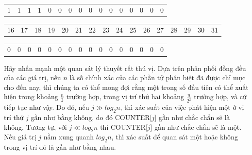 \documentclass[a4paper,13pt]{article}
\theoremstyle{mytheor}
\begin{document}
\begin{mdframed}
\begin{center}
\begin{tabular}{|p{0.4cm}|p{0.4cm}|p{0.4cm}|p{0.4cm}|p{0.4cm}|p{0.4cm}|p{0.4cm}|p{0.4cm}|p{0.4cm}|p{0.4cm}|p{0.4cm}|p{0.4cm}|p{0.4cm}|p{0.4cm}|p{0.4cm}|p{0.4cm}|}
            \hline
            1 & 1 & 1 & 1 & 0 & 0 & 0 & 0 & 0 & 0 & 0 & 0 & 0 & 0 & 0 & 0 \\ \cline{1-16} %
        \end{tabular}
        \begin{tabular}{p{0.4cm}p{0.4cm}p{0.4cm}p{0.4cm}p{0.4cm}p{0.4cm}p{0.4cm}p{0.4cm}p{0.4cm}p{0.4cm}p{0.4cm}p{0.4cm}p{0.4cm}p{0.4cm}p{0.4cm}p{0.4cm}}
            16 & 17 & 18 & 19 & 20 & 21 & 22 & 23 & 24 & 25 & 26 & 27 & 28 & 29 & 30 & 31 %
        \end{tabular}
        \begin{tabular}{|p{0.4cm}|p{0.4cm}|p{0.4cm}|p{0.4cm}|p{0.4cm}|p{0.4cm}|p{0.4cm}|p{0.4cm}|p{0.4cm}|p{0.4cm}|p{0.4cm}|p{0.4cm}|p{0.4cm}|p{0.4cm}|p{0.4cm}|p{0.4cm}|}
            \hline
            0 & 0 & 0 & 0 & 0 & 0 & 0 & 0 & 0 & 0 & 0 & 0 & 0 & 0 & 0 & 0 \\ \cline{1-16} %
        \end{tabular}
    \end{center}
\end{mdframed}

Hãy nhấn mạnh một quan sát lý thuyết rất thú vị. Dựa trên phân phối đồng đều của các giá trị, nếu $n$ là số chính xác của các phần tử phân biệt 
đã được chỉ mục cho đến nay, thì chúng ta có thể mong đợi rằng một trong số đầu tiên có thể xuất hiện trong khoảng $\frac{n}{2}$ trường hợp, 
trong vị trí thứ hai khoảng $\frac{n}{2^2}$ trường hợp, và cứ tiếp tục như vậy. Do đó, nếu $j\gg log_2n$, thì xác suất của việc phát hiện một 
ở vị trí thứ $j$ gần như bằng không, do đó COUNTER[$j$] gần như chắc chắn sẽ là không. Tương tự, với $j\ll log_2n$ thì COUNTER[$j$] gần như chắc chắn 
sẽ là một. Nếu giá trị $j$ nằm xung quanh $log_2n$, thì xác suất để quan sát một hoặc không trong vị trí đó là gần như bằng nhau.
\end{document}
